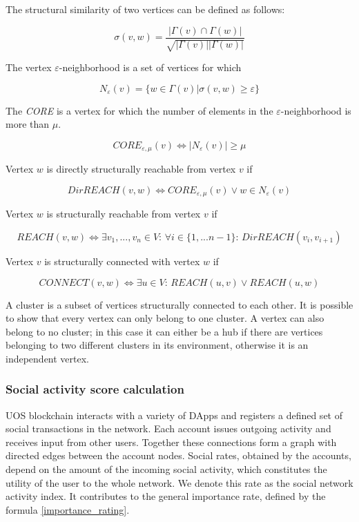 \documentclass[a4paper,12pt]{article}
\begin{document}
The structural similarity of two vertices can be defined as follows:



$$
\sigma(v,w)=\frac{ |\Gamma(v) \cap \Gamma(w)|}{\sqrt{|\Gamma(v)||\Gamma(w)|}}
$$

The vertex $\varepsilon$-neighborhood is a set of vertices for which


$$
N_{\varepsilon}(v) = \{ w \in \Gamma(v) | \sigma(v,w) \ge \varepsilon \}
$$

The \textit{CORE} is a vertex for which the number of elements in the $\varepsilon$-neighborhood is more than $\mu$.

$$
CORE_{\varepsilon,\mu}(v) \Leftrightarrow |N_{\varepsilon} (v)| \ge \mu
$$

Vertex $w$ is directly structurally reachable from vertex $v$ if



$$
DirREACH(v,w) \Leftrightarrow CORE_{\varepsilon,\mu}(v) \vee w \in N_{\varepsilon}(v)
$$

Vertex $w$ is structurally reachable from vertex $v$ if


$$
REACH(v,w) \Leftrightarrow \exists v_1,...,v_n \in V \text{: } \forall i \in \{1,...n-1\} \text{: } DirREACH(v_i,v_{i+1})
$$

Vertex $v$ is structurally connected with vertex $w$ if



$$
CONNECT(v,w) \Leftrightarrow \exists u \in V\text{: } REACH(u,v) \vee REACH(u,w)
$$

A cluster is a subset of vertices structurally connected to each other. It is possible to show that every vertex can only belong to one cluster. A vertex can also belong to no cluster; in this case it can either be a hub if there are vertices belonging to two different clusters in its environment, otherwise it is an independent vertex.




\subsubsection{Social activity score calculation}

U{\degree}OS blockchain interacts with a variety of DApps and registers a defined set of social transactions in the network. Each account issues outgoing activity and receives input from other users. Together these connections form a graph with directed edges between the account nodes. Social rates, obtained by the accounts, depend on the amount of the incoming social activity, which constitutes the utility of the user to the whole network. We denote this rate as the social network activity index. It contributes to the general importance rate, defined by the formula \ref{importance_rating}.  
\end{document}

